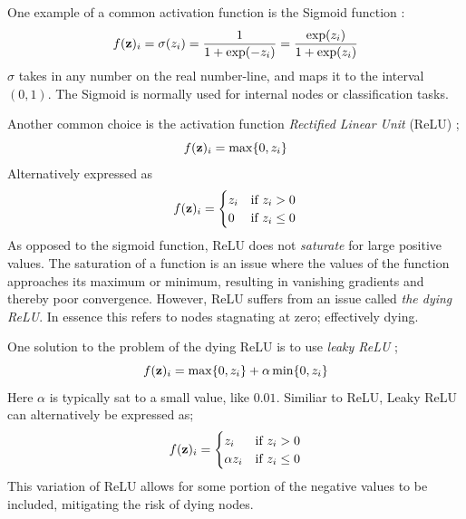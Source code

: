One example of a common activation function is the Sigmoid function \citep[Logistic Regression]{morten}: 
\begin{equation}\label{sigmoid}
    f(\bold{z})_i=\sigma(z_i)=\frac{1}{1+\exp(-z_i)}=\frac{\exp(z_i)}{1+\exp(z_i)}
\end{equation}
$\sigma$ takes in any number on the real number-line, and maps it to the interval $(0,1)$. The Sigmoid is normally used for internal nodes or classification tasks. 

Another common choice is the activation function \textit{Rectified Linear Unit} (ReLU) \citep[Building a feed forward neural network]{morten}; 
\begin{equation}\label{relu}
    f(\bold{z})_i=\max\{0, z_i\}
\end{equation}
Alternatively expressed as
\begin{equation}
    f(\bold{z})_i = \begin{cases} 
      z_i & \text{if } z_i > 0 \\
      0 & \text{if } z_i \leq 0 
   \end{cases}    
\end{equation}
As opposed to the sigmoid function, ReLU does not \textit{saturate} for large positive values. The saturation of a function is an issue where the values of the function approaches its maximum or minimum, resulting in vanishing gradients and thereby poor convergence. However, ReLU suffers from an issue called \textit{the dying ReLU}. In essence this refers to nodes stagnating at zero; effectively dying. 

One solution to the problem of the dying ReLU is to use \textit{leaky ReLU} \citep[p. 190]{Goodfellow-et-al-2016}; 
\begin{equation}
    f(\bold{z})_i=\max\{0, z_i\}+\alpha\min\{0,z_i\}
\end{equation}
Here $\alpha$ is typically sat to a small value, like $0.01$. 
Similiar to ReLU, Leaky ReLU can alternatively be expressed as; 
\begin{equation}
    f(\bold{z})_i = \begin{cases} 
      z_i & \text{if } z_i > 0 \\
      \alpha z_i & \text{if } z_i \leq 0 
   \end{cases}
\end{equation}
This variation of ReLU allows for some portion of the negative values to be included, mitigating the risk of dying nodes. 

